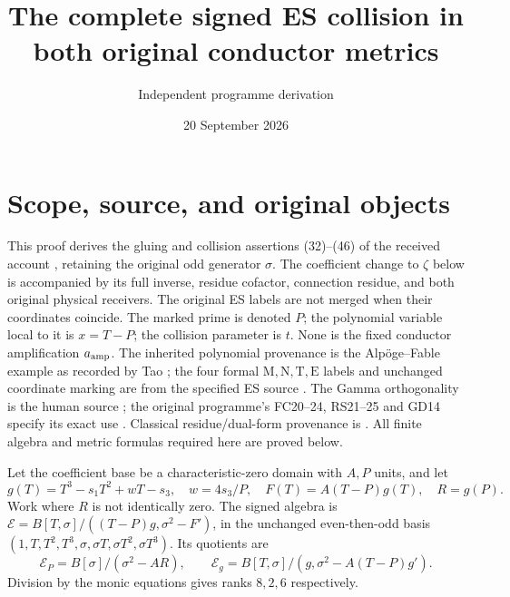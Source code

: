 \documentclass[11pt]{article}
\title{The complete signed ES collision in both original conductor metrics}
\author{Independent programme derivation}\date{20 September 2026}
\begin{document}
\maketitle

\section{Scope, source, and original objects}
This proof derives the gluing and collision assertions (32)--(46) of the
received account \cite{Received}, retaining the original odd generator
$\sigma$. The coefficient change to $\zeta$ below is accompanied by its full
inverse, residue cofactor, connection residue, and both original physical
receivers. The original ES labels are not merged when their coordinates
coincide. The marked prime is denoted $P$; the polynomial variable local to
it is $x=T-P$; the collision parameter is $t$. None is the fixed conductor
amplification $a_{\rm amp}$. The inherited polynomial provenance is the
Alp\"oge--Fable example as recorded by Tao \cite{Tao}; the four formal
$\mathrm M,\mathrm N,\mathrm T,\mathrm E$ labels and unchanged coordinate
marking are from the specified ES source \cite{ES}. The Gamma orthogonality
is the human source \cite{Gamma}; the original programme's FC20--24,
RS21--25 and GD14 specify its exact use \cite{Programme}. Classical
residue/dual-form provenance is \cite[Section 2]{JouveRV}. All finite
algebra and metric formulas required here are proved below.

Let the coefficient base be a characteristic-zero domain with $A,P$ units,
and let
\begin{equation}
 g(T)=T^3-s_1T^2+wT-s_3,\quad w=4s_3/P,\quad
 F(T)=A(T-P)g(T),\quad R=g(P).
 \tag{ECC1}
\end{equation}
Work where $R$ is not identically zero. The signed algebra is
$\mathscr E=B[T,\sigma]/((T-P)g,\sigma^2-F')$, in the unchanged even-then-odd
basis $(1,T,T^2,T^3,\sigma,\sigma T,\sigma T^2,\sigma T^3)$.
Its quotients are
\begin{equation}
 \mathscr E_P=B[\sigma]/(\sigma^2-AR),\qquad
 \mathscr E_g=B[T,\sigma]/(g,\sigma^2-A(T-P)g').
 \tag{ECC2}
\end{equation}
Division by the monic equations gives ranks $8,2,6$ respectively.
\end{document}
